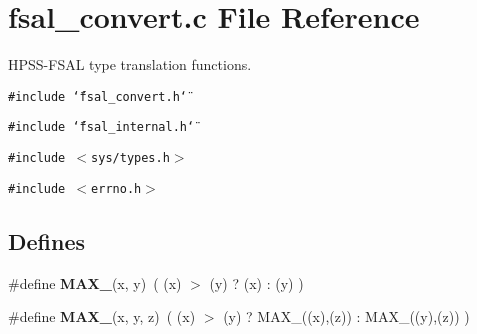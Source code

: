 \section{fsal\_\-convert.c File Reference}
\label{fsal__convert_8c}
HPSS-FSAL type translation functions.  


{\tt \#include \char`\"{}fsal\_\-convert.h\char`\"{}}\par
{\tt \#include \char`\"{}fsal\_\-internal.h\char`\"{}}\par
{\tt \#include $<$sys/types.h$>$}\par
{\tt \#include $<$errno.h$>$}\par
\subsection*{Defines}
\begin{CompactItemize}
\item 
\#define \textbf{MAX\_}(x, y)~( (x) $>$ (y) ? (x) : (y) )\label{fsal__convert_8c_29bc465820d0719bc24cb339e75806d0}

\item 
\#define \textbf{MAX\_}(x, y, z)~( (x) $>$ (y) ? MAX\_((x),(z)) : MAX\_((y),(z)) )\label{fsal__convert_8c_e28623bae2af7d233caa8038601aa853}

\end{CompactItemize}

